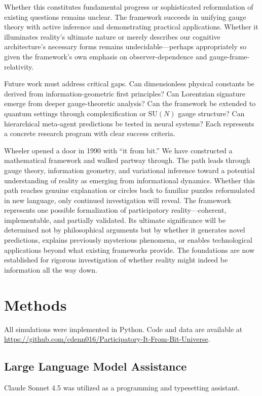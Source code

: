\documentclass[11pt]{article}
\begin{document}
Whether this constitutes fundamental progress or sophisticated reformulation of existing questions remains unclear. The framework succeeds in unifying gauge theory with active inference and demonstrating practical applications. Whether it illuminates reality's ultimate nature or merely describes our cognitive architecture's necessary forms remains undecidable---perhaps appropriately so given the framework's own emphasis on observer-dependence and gauge-frame-relativity.

Future work must address critical gaps. Can dimensionless physical constants be derived from information-geometric first principles? Can Lorentzian signature emerge from deeper gauge-theoretic analysis? Can the framework be extended to quantum settings through complexification or $\mathrm{SU}(N)$ gauge structure? Can hierarchical meta-agent predictions be tested in neural systems? Each represents a concrete research program with clear success criteria.

Wheeler opened a door in 1990 with ``it from bit.'' We have constructed a mathematical framework and walked partway through. The path leads through gauge theory, information geometry, and variational inference toward a potential understanding of reality as emerging from informational dynamics. Whether this path reaches genuine explanation or circles back to familiar puzzles reformulated in new language, only continued investigation will reveal. The framework represents one possible formalization of participatory reality---coherent, implementable, and partially validated. Its ultimate significance will be determined not by philosophical arguments but by whether it generates novel predictions, explains previously mysterious phenomena, or enables technological applications beyond what existing frameworks provide. The foundations are now established for rigorous investigation of whether reality might indeed be information all the way down.

\section*{Methods}

All simulations were implemented in Python. Code and data are available at \url{https://github.com/cdenn016/Participatory-It-From-Bit-Universe}.

\subsection*{Large Language Model Assistance}
Claude Sonnet 4.5 was utilized as a programming and typesetting assistant.
\end{document}
